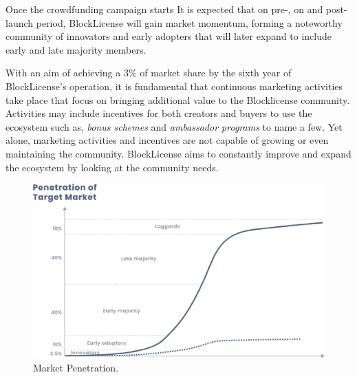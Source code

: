 Once the crowdfunding campaign starts 
It is expected that on pre-, on and post-launch period, BlockLicense will gain market momentum, forming a noteworthy community of innovators and early adopters that will later expand to include early and late majority members. 

With an aim of achieving a 3\% of market share by the sixth year of  BlockLicense's operation, it is fundamental that  continuous marketing activities take place that focus on bringing additional value to the Blocklicense community. Activities may include incentives for both creators and buyers to use the ecosystem such as, \textit{bonus schemes} and \textit{ambassador programs} to name a few. Yet alone, marketing activities and incentives are not capable of growing or even maintaining the community. BlockLicense aims to constantly improve and expand the ecosystem by looking at the community needs.

\begin{figure}[h]
\centering
\begin{minipage}{1\textwidth}
  \centering
  \includegraphics[width=.8\linewidth]{./figures/fig11.jpg}
  \caption{Market Penetration.}
  \label{fig:scurve}
\end{minipage}
\end{figure}